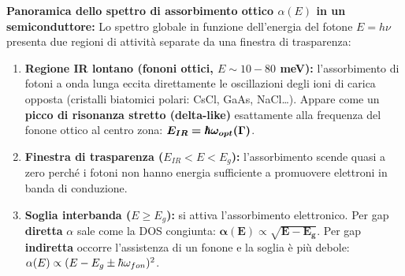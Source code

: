 
\vspace{0.3cm}

\textbf{Panoramica dello spettro di assorbimento ottico $\alpha(E)$ in un semiconduttore:} 
Lo spettro globale in funzione dell'energia del fotone $E=h\nu$ presenta due regioni di attività separate da una finestra di trasparenza:
\begin{enumerate}
    \item \textbf{Regione IR lontano (fononi ottici, $E\sim10-80$ meV):} l'assorbimento di fotoni a onda lunga eccita direttamente le oscillazioni degli ioni di carica opposta (cristalli biatomici polari: CsCl, GaAs, NaCl\dots). Appare come un \textbf{picco di risonanza stretto (delta-like)} esattamente alla frequenza del fonone ottico al centro zona: $\bm{E_{IR}=\hbar\omega_{opt}(\Gamma)}$.
    \item \textbf{Finestra di trasparenza ($E_{IR}<E<E_g$):} l'assorbimento scende quasi a zero perché i fotoni non hanno energia sufficiente a promuovere elettroni in banda di conduzione.
    \item \textbf{Soglia interbanda ($E\ge E_g$):} si attiva l'assorbimento elettronico. Per gap \textbf{diretta} $\alpha$ sale come la DOS congiunta: $\bm{\alpha(E)\propto\sqrt{E-E_g}}$. Per gap \textbf{indiretta} occorre l'assistenza di un fonone e la soglia è più debole: $\alpha(E)\propto(E-E_g\pm\hbar\omega_{fon})^2$.
\end{enumerate}

